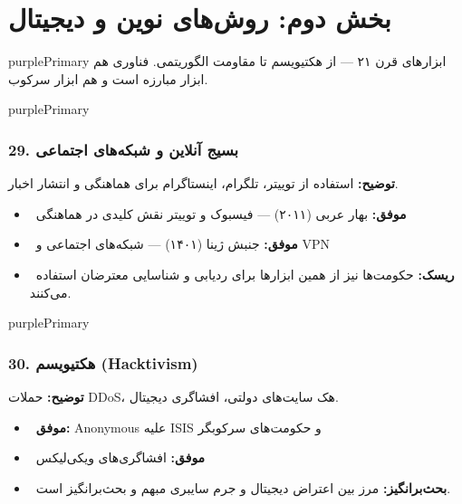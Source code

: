 \documentclass[a4paper,12pt]{article}
\newcommand{\success}[1]{\textcolor{greenPrimary}{\faCheckCircle\ \textbf{موفق:}} #1}
\newcommand{\debate}[1]{\textcolor{orangePrimary}{\faQuestionCircle\ \textbf{بحث‌برانگیز:}} #1}
\newcommand{\methodnum}[1]{\textcolor{purpleLight}{\textbf{#1.}}}
\begin{document}

\section{\textcolor{purpleLight}{\faGlobe} بخش دوم: روش‌های نوین و دیجیتال}

\begin{sectionbox}{purplePrimary}
ابزارهای قرن ۲۱ — از هکتیویسم تا مقاومت الگوریتمی. فناوری هم ابزار مبارزه است و هم ابزار سرکوب.
\end{sectionbox}

\begin{methodcard}{purplePrimary}
\subsubsection{\methodnum{29} بسیج آنلاین و شبکه‌های اجتماعی}
\textbf{توضیح:} استفاده از توییتر، تلگرام، اینستاگرام برای هماهنگی و انتشار اخبار.

\begin{itemize}[label=\textcolor{greenPrimary}{\faCheckCircle}]
  \item \success{بهار عربی (۲۰۱۱) — فیسبوک و توییتر نقش کلیدی در هماهنگی}
  \item \success{جنبش ژینا (۱۴۰۱) — شبکه‌های اجتماعی و VPN}
\end{itemize}
\begin{itemize}[label=\textcolor{redPrimary}{\faExclamationTriangle}]
  \item \textcolor{redPrimary}{\faExclamationTriangle\ \textbf{ریسک:}} حکومت‌ها نیز از همین ابزارها برای ردیابی و شناسایی معترضان استفاده می‌کنند.
\end{itemize}
\end{methodcard}

\begin{methodcard}{purplePrimary}
\subsubsection{\methodnum{30} هکتیویسم (Hacktivism)}
\textbf{توضیح:} حملات DDoS، هک سایت‌های دولتی، افشاگری دیجیتال.

\begin{itemize}[label=\textcolor{greenPrimary}{\faCheckCircle}]
  \item \success{Anonymous علیه ISIS و حکومت‌های سرکوبگر}
  \item \success{افشاگری‌های ویکی‌لیکس}
\end{itemize}
\begin{itemize}[label=\textcolor{yellowPrimary}{\faExclamationTriangle}]
  \item \debate{مرز بین اعتراض دیجیتال و جرم سایبری مبهم و بحث‌برانگیز است.}
\end{itemize}
\end{methodcard}
\end{document}
